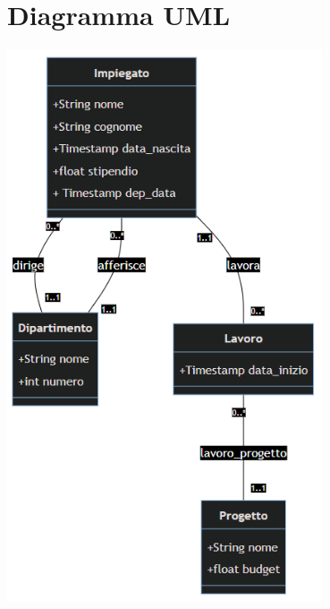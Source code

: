 \documentclass[12pt, letterpaper]{article}
\begin{document}
\section{Diagramma UML}
\begin{center}
    \includegraphics[width=0.7\textwidth ]{UML_ita2.png}
\end{center}
\end{document}
